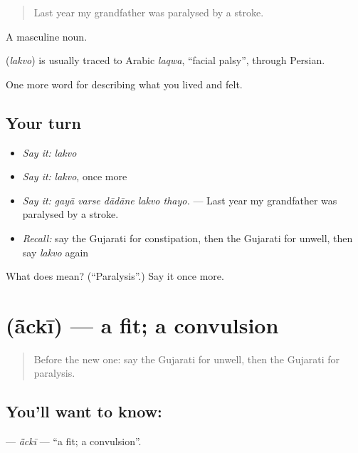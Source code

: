 \begin{quote}
Last year my grandfather was paralysed by a stroke.
\end{quote}

A masculine noun.

\begin{cousinweb}
\textbf{} (\emph{lakvo}) is usually traced to Arabic \emph{laqwa}, \textquotedblleft{}facial palsy\textquotedblright{}, through Persian.
\end{cousinweb}

\begin{grammarlens}[title={What you've built}]
One more word for describing what you lived and felt.
\end{grammarlens}

\subsection*{Your turn}
\begin{itemize}
\raggedright
  \item \emph{Say it:} \emph{lakvo}
  \item \emph{Say it:} \emph{lakvo}, once more
  \item \emph{Say it:} \emph{gayā varse dādāne lakvo thayo.} — Last year my grandfather was paralysed by a stroke.
  \item \emph{Recall:} say the Gujarati for constipation, then the Gujarati for unwell, then say \emph{lakvo} again
\end{itemize}

\begin{tcolorbox}[breakable,colback=teal!4,colframe=teal!35!black,title={Before you move on}]
What does  mean? (\textquotedblleft{}Paralysis\textquotedblright{}.) Say it once more.
\end{tcolorbox}
\section[\texorpdfstring{\gu{આંચકી} (ā̃ckī)}{આંચકી (ā̃ckī)}]{ (ā̃ckī) — a fit; a convulsion}

\label{lesson:GU-C479-acki}



\begin{quote}
Before the new one: say the Gujarati for unwell, then the Gujarati for paralysis.
\end{quote}

\subsection*{You'll want to know: }
\textbf{} — \emph{ā̃ckī} — \textquotedblleft{}a fit; a convulsion\textquotedblright{}.

